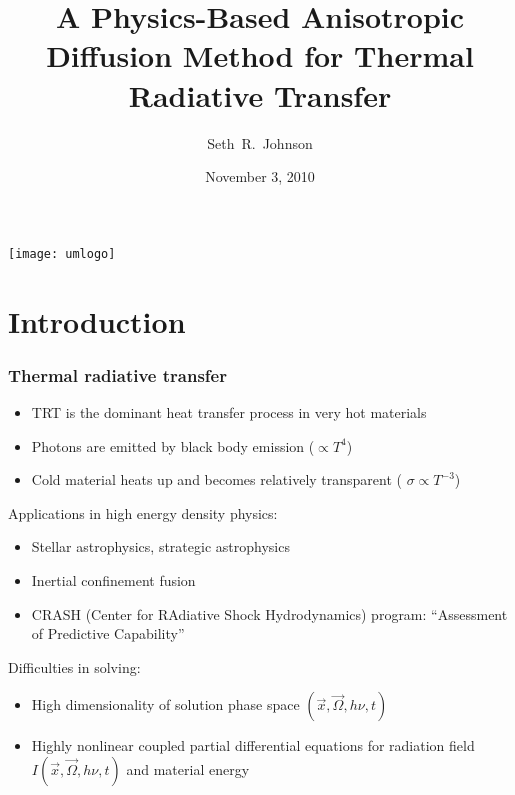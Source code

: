 \documentclass{beamer}
\title[Thesis Prospectus]%
{A Physics-Based Anisotropic Diffusion Method for Thermal Radiative
Transfer}
\author[SRJ]{Seth~R.~Johnson}
\institute[UMich]{
University of Michigan, Ann Arbor
}
\date[11/3/2010]{November 3, 2010}
\begin{document}

\begin{frame}
\titlepage
\begin{center}
  \texttt{[image: umlogo]}
\end{center}
\end{frame}

\section{Introduction}
\begin{frame}
  \frametitle{Thermal radiative transfer}
  \begin{itemize}
    \item TRT is the dominant heat transfer process in very hot materials
    \item Photons are emitted by black body emission ($\propto T^4$)
    \item Cold material heats up and becomes relatively transparent (
      $\sigma\propto T^{-3}$)
  \end{itemize}

  Applications in high energy density physics:
  \begin{itemize}
    \item Stellar astrophysics, \textcolor[gray]{.5}{strategic astrophysics}
    \item Inertial confinement fusion
    \item CRASH (Center for RAdiative Shock Hydrodynamics) program: ``Assessment
          of Predictive Capability''
  \end{itemize}
  Difficulties in solving:
  \begin{itemize}
    \item High dimensionality of solution phase space $(\vec{x}, \vec{\Omega},
      h\nu, t)$
    \item Highly nonlinear coupled partial differential equations for radiation
      field $I(\vec{x}, \vec{\Omega}, h\nu, t)$ and material energy
  \end{itemize}
\end{frame}
\end{document}
